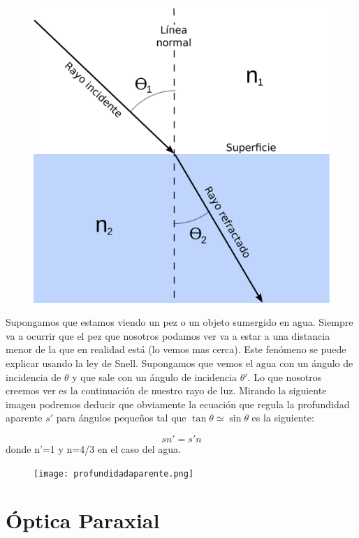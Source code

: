 \documentclass[12pt]{article}
\numberwithin{equation}{section}
\numberwithin{figure}{section}
\begin{document}
\begin{figure}[h!] \centering
\includegraphics[scale=0.08]{Refracción.pdf}
\end{figure}

Supongamos que estamos viendo un pez o un objeto sumergido en agua. Siempre va a ocurrir que el pez que nosotros podamos ver va a estar a una distancia menor de la que en realidad está (lo vemos mas cerca). Este fenómeno se puede explicar usando la ley de Snell. Supongamos que vemos el agua con un ángulo de incidencia de $\theta$ y que sale con un ángulo de incidencia $\theta'$. Lo que nosotros creemos ver es la continuación de nuestro rayo de luz. Mirando la siguiente imagen podremos deducir que obviamente la ecuación que regula la profundidad aparente $s'$ para ángulos pequeños tal que $ \tan \theta \simeq \sin \theta $  es la siguiente:

\begin{equation}
s n' = s' n
\end{equation}
donde n'=1 y n=4/3 en el caso del agua.


\begin{figure}[h!] \centering
\texttt{[image: profundidadaparente.png]}
\end{figure}

\newpage

\section{Óptica Paraxial}
\end{document}

